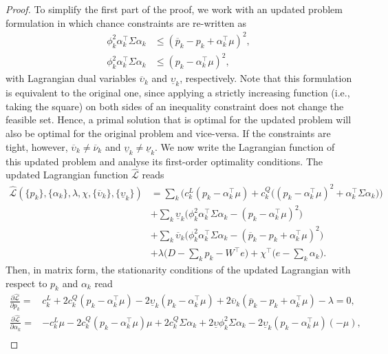 \documentclass{article}
\begin{document}
\begin{proof}
To simplify the first part of the proof, we work with an updated problem formulation in which chance constraints are re-written as
\begin{align*}
\phi_k^2 \alpha_k^\top \Sigma \alpha_k &\le (\overline{p}_k - p_k + \alpha_k^\top \mu)^2,\\
\phi_k^2 \alpha_k^\top \Sigma \alpha_k &\le (p_k - \alpha_k^\top \mu)^2,
\end{align*}
with Lagrangian dual variables $\overline{\upsilon}_k$ and $\underline{\upsilon}_k$, respectively. Note that this formulation is equivalent to the original one, since applying a strictly increasing function (i.e., taking the square) on both sides of an inequality constraint does not change the feasible set. Hence, a primal solution that is optimal for the updated problem will also be optimal for the original problem and vice-versa. If the constraints are tight, however, $\overline{\upsilon}_k \ne \overline{\nu}_k$ and $\underline{\upsilon}_k \ne \underline{\nu}_k$. We now write the Lagrangian function of this updated problem and analyse its first-order optimality conditions. The updated Lagrangian function $\hat{\mathcal{L}}$ reads
\begin{align*}
\hat{\mathcal{L}}(\{p_k\}, \{\alpha_k\}, \lambda, \chi, \{\overline{\upsilon}_k\}, \{\underline{\upsilon}_k\}) &= \sum_k \Big(c_k^L(p_k - \alpha_k^\top \mu) + c_k^Q \big((p_k - \alpha_k^\top \mu)^2 + \alpha_k^\top \Sigma \alpha_k\big)\Big)\\
&+ \sum_k \underline{\upsilon}_k \big(\phi_k^2 \alpha_k^\top \Sigma \alpha_k - (p_k - \alpha_k^\top \mu)^2\big)\\
&+ \sum_k \overline{\upsilon}_k \big(\phi_k^2 \alpha_k^\top \Sigma \alpha_k - (\overline{p}_k - p_k + \alpha_k^\top \mu)^2\big)\\
&+ \lambda \Big(D - \sum_k p_k - W^\top e\Big) + \chi^\top \Big(e - \sum_k \alpha_{k}\Big).
\end{align*}
Then, in matrix form, the stationarity conditions of the updated Lagrangian with respect to $p_k$ and $\alpha_k$ read
\begin{align*}
\frac{\partial \hat{\mathcal{L}}}{\partial p_k} =& c_k^L + 2 c_k^Q(p_k - \alpha_k^\top \mu) - 2 \underline{\upsilon}_k(p_k - \alpha_k^\top \mu) + 2 \overline{\upsilon}_k (\overline{p}_k - p_k + \alpha_k^\top \mu) - \lambda = 0,\\
\frac{\partial \hat{\mathcal{L}}}{\partial \alpha_k} =& -c_k^L \mu - 2 c_k^Q (p_k - \alpha_k^\top \mu) \mu + 2 c_k^Q \Sigma \alpha_k + 2 \underline{\upsilon} \phi_k^2 \Sigma \alpha_k - 2 \underline{\upsilon}_k (p_k - \alpha_k^\top \mu)(-\mu),\\

\end{align*}
\end{proof}
\end{document}
